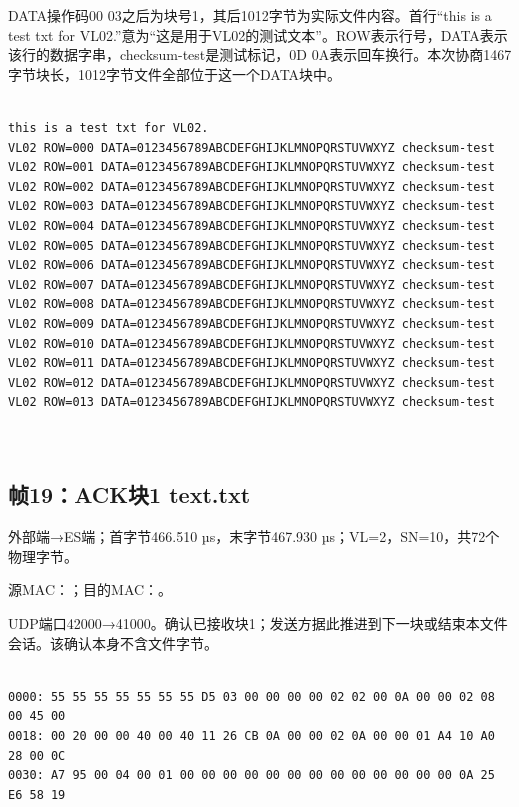 DATA操作码00 03之后为块号1，其后1012字节为实际文件内容。首行“this is a test txt for VL02.”意为“这是用于VL02的测试文本”。ROW表示行号，DATA表示该行的数据字串，checksum-test是测试标记，0D 0A表示回车换行。本次协商1467字节块长，1012字节文件全部位于这一个DATA块中。

\par\noindent\begin{minipage}{\linewidth}
\begin{lstlisting}[caption={该DATA块还原的实际文本}]

this is a test txt for VL02.
VL02 ROW=000 DATA=0123456789ABCDEFGHIJKLMNOPQRSTUVWXYZ checksum-test
VL02 ROW=001 DATA=0123456789ABCDEFGHIJKLMNOPQRSTUVWXYZ checksum-test
VL02 ROW=002 DATA=0123456789ABCDEFGHIJKLMNOPQRSTUVWXYZ checksum-test
VL02 ROW=003 DATA=0123456789ABCDEFGHIJKLMNOPQRSTUVWXYZ checksum-test
VL02 ROW=004 DATA=0123456789ABCDEFGHIJKLMNOPQRSTUVWXYZ checksum-test
VL02 ROW=005 DATA=0123456789ABCDEFGHIJKLMNOPQRSTUVWXYZ checksum-test
VL02 ROW=006 DATA=0123456789ABCDEFGHIJKLMNOPQRSTUVWXYZ checksum-test
VL02 ROW=007 DATA=0123456789ABCDEFGHIJKLMNOPQRSTUVWXYZ checksum-test
VL02 ROW=008 DATA=0123456789ABCDEFGHIJKLMNOPQRSTUVWXYZ checksum-test
VL02 ROW=009 DATA=0123456789ABCDEFGHIJKLMNOPQRSTUVWXYZ checksum-test
VL02 ROW=010 DATA=0123456789ABCDEFGHIJKLMNOPQRSTUVWXYZ checksum-test
VL02 ROW=011 DATA=0123456789ABCDEFGHIJKLMNOPQRSTUVWXYZ checksum-test
VL02 ROW=012 DATA=0123456789ABCDEFGHIJKLMNOPQRSTUVWXYZ checksum-test
VL02 ROW=013 DATA=0123456789ABCDEFGHIJKLMNOPQRSTUVWXYZ checksum-test



\end{lstlisting}
\end{minipage}\par

\subsection*{帧19：ACK块1 text.txt}

外部端→ES端；首字节466.510 µs，末字节467.930 µs；VL=2，SN=10，共72个物理字节。

源MAC：；目的MAC：。

UDP端口42000→41000。确认已接收块1；发送方据此推进到下一块或结束本文件会话。该确认本身不含文件字节。

\par\noindent\begin{minipage}{\linewidth}
\begin{lstlisting}[caption={帧19物理字节，偏移0000--0047}]

0000: 55 55 55 55 55 55 55 D5 03 00 00 00 00 02 02 00 0A 00 00 02 08 00 45 00
0018: 00 20 00 00 40 00 40 11 26 CB 0A 00 00 02 0A 00 00 01 A4 10 A0 28 00 0C
0030: A7 95 00 04 00 01 00 00 00 00 00 00 00 00 00 00 00 00 00 0A 25 E6 58 19

\end{lstlisting}
\end{minipage}\par

